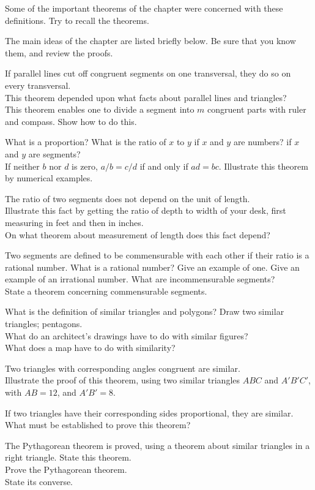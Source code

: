\documentclass[11pt]{book}
\begin{document}
Some of the important theorems of the chapter were concerned with these
definitions. Try to recall the theorems.

The main ideas of the chapter are listed briefly below. Be sure that you know
them, and review the proofs.

\begin{exlist}
\item If parallel lines cut off congruent segments on one transversal, they do so
      on every transversal.\\
      This theorem depended upon what facts about parallel lines and triangles?\\
      This theorem enables one to divide a segment into $m$ congruent parts with
      ruler and compass. Show how to do this.
\item What is a proportion? What is the ratio of $x$ to $y$ if $x$ and $y$ are
      numbers? if $x$ and $y$ are segments?\\
      If neither $b$ nor $d$ is zero, $a/b = c/d$ if and only if $ad = bc$.
      Illustrate this theorem by numerical examples.
\item The ratio of two segments does not depend on the unit of length.\\
      Illustrate this fact by getting the ratio of depth to width of your desk,
      first measuring in feet and then in inches.\\
      On what theorem about measurement of length does this fact depend?
\item[\stex 4.] Two segments are defined to be commensurable with each other if
      their ratio is a rational number. What is a rational number? Give an
      example of one. Give an example of an irrational number. What are
      incommensurable segments?\\
      State a theorem concerning commensurable segments.
\item[5.] What is the definition of similar triangles and polygons? Draw two
      similar triangles; pentagons.\\
      What do an architect's drawings have to do with similar figures?\\
      What does a map have to do with similarity?
\item[6.] Two triangles with corresponding angles congruent are similar.\\
      Illustrate the proof of this theorem, using two similar triangles $ABC$
      and $A'B'C'$, with $AB = 12$, and $A'B' = 8$.
\item[7.] If two triangles have their corresponding sides proportional, they
      are similar.\\
      What must be established to prove this theorem?
\item[8.] The Pythagorean theorem is proved, using a theorem about similar
      triangles in a right triangle. State this theorem.\\
      Prove the Pythagorean theorem.\\
      State its converse.
\end{exlist}
\end{document}
